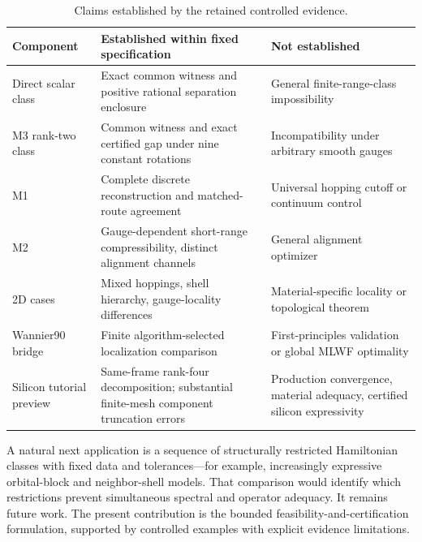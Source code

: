 \documentclass[11pt]{article}
\begin{document}
\begin{table}[htbp]\centering\small
\caption{Claims established by the retained controlled evidence.}\label{tab:scope}
\begin{tabular}{p{.20\linewidth}p{.36\linewidth}p{.35\linewidth}}\toprule
Component & Established within fixed specification & Not established\\\midrule
Direct scalar class & Exact common witness and positive rational separation enclosure & General finite-range-class impossibility\\
M3 rank-two class & Common witness and exact certified gap under nine constant rotations & Incompatibility under arbitrary smooth gauges\\
M1 & Complete discrete reconstruction and matched-route agreement & Universal hopping cutoff or continuum control\\
M2 & Gauge-dependent short-range compressibility, distinct alignment channels & General alignment optimizer\\
2D cases & Mixed hoppings, shell hierarchy, gauge-locality differences & Material-specific locality or topological theorem\\
Wannier90 bridge & Finite algorithm-selected localization comparison & First-principles validation or global MLWF optimality\\
Silicon tutorial preview & Same-frame rank-four decomposition; substantial finite-mesh component truncation errors & Production convergence, material adequacy, certified silicon expressivity\\\bottomrule
\end{tabular}
\end{table}

A natural next application is a sequence of structurally restricted Hamiltonian classes with fixed data and tolerances---for example, increasingly expressive orbital-block and neighbor-shell models. That comparison would identify which restrictions prevent simultaneous spectral and operator adequacy. It remains future work. The present contribution is the bounded feasibility-and-certification formulation, supported by controlled examples with explicit evidence limitations.
\end{document}
